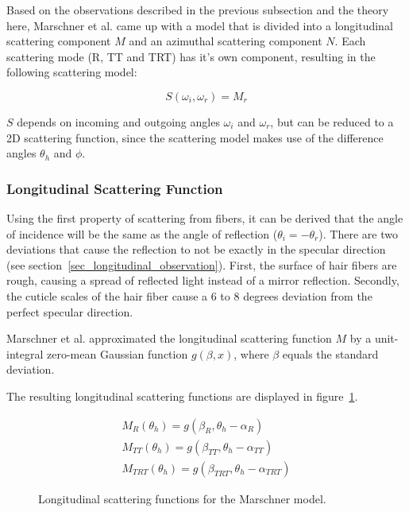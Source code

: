 \documentclass[11pt,a4paper]{report}
\begin{document}
Based on the observations described in the previous subsection and the theory here, Marschner et al. came up with a model that is divided into a longitudinal scattering component $M$ and an azimuthal scattering component $N$. Each scattering mode (R, TT and TRT) has it's own component, resulting in the following scattering model:

\begin{equation}
S(\omega_i, \omega_r) = M_r
\end{equation}

$S$ depends on incoming and outgoing angles $\omega_i$ and $\omega_r$, but can be reduced to a 2D scattering function, since the scattering model makes use of the difference angles $\theta_h$ and $\phi$.

\subsubsection{Longitudinal Scattering Function}

Using the first property of scattering from fibers, it can be derived that the angle of incidence will be the same as the angle of reflection ($\theta_i = -\theta_r$). There are two deviations that cause the reflection to not be exactly in the specular direction (see section~\ref{sec_longitudinal_observation}). First, the surface of hair fibers are rough, causing a spread of reflected light instead of a mirror reflection. Secondly, the cuticle scales of the hair fiber cause a 6 to 8 degrees deviation from the perfect specular direction.

Marschner et al. approximated the longitudinal scattering function $M$ by a unit-integral zero-mean Gaussian function $g(\beta, x)$, where $\beta$ equals the standard deviation.

The resulting longitudinal scattering functions are displayed in figure~\ref{longitudinal_marschner}.

\begin{figure}
\begin{gather*}
M_R(\theta_h) = g(\beta_R, \theta_h - \alpha_R) \\
M_{TT}(\theta_h) = g(\beta_{TT}, \theta_h - \alpha_{TT}) \\
M_{TRT}(\theta_h) = g(\beta_{TRT}, \theta_h - \alpha_{TRT})
\end{gather*}

\caption{Longitudinal scattering functions for the Marschner model.}
\label{longitudinal_marschner}
\end{figure}
\end{document}
